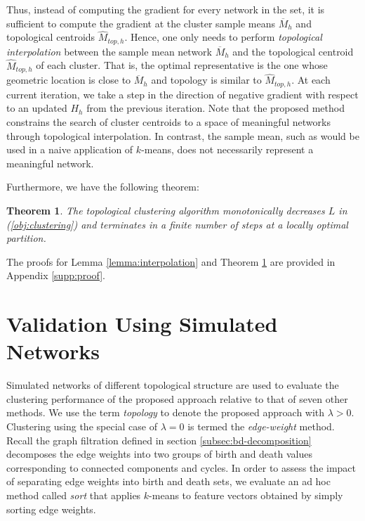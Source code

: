\documentclass{article} %
\newtheorem{theorem}{Theorem}
\begin{document}
Thus, instead of computing the gradient for every network in the set, it is sufficient to compute the gradient at the cluster sample means $\overline M_{h}$ and topological centroids $\widehat M_{top,h}$.
Hence, one only needs to perform {\em topological interpolation} between the sample mean network $\overline M_{h}$ and the topological centroid $\widehat M_{top,h}$ of each cluster. That is, the optimal representative is the one whose geometric location is close to $\overline M_{h}$ and topology is similar to $\widehat M_{top,h}$. 
At each current iteration, we take a step in the direction of negative gradient with respect to an updated $H_h$ from the previous iteration.
Note that the proposed method constrains the search of cluster centroids to a space of meaningful networks through topological interpolation. In contrast, the sample mean, such as would be used in a naive application of $k$-means, does not necessarily represent a meaningful network.

Furthermore, we have the following theorem:

\begin{theorem}
The topological clustering algorithm monotonically decreases $L$ in (\ref{obj:clustering}) and terminates in a finite number of steps at a locally optimal partition.
\label{lemma:localminimum}
\end{theorem}

The proofs for Lemma \ref{lemma:interpolation} and Theorem \ref{lemma:localminimum} are provided in Appendix \ref{supp:proof}.



\section{Validation Using Simulated Networks}
\label{sec:validation}

Simulated networks of different topological structure are used to evaluate the clustering performance of the proposed approach relative to that of seven other methods.
We use the term {\em topology} to denote the proposed approach with $\lambda > 0$.  Clustering using the special case of $\lambda = 0$ is termed the {\em edge-weight} method. Recall the graph filtration defined in section \ref{subsec:bd-decomposition} decomposes the edge weights into two groups of birth and death values corresponding to connected components and cycles. In order to assess the impact of separating edge weights into birth and death sets, we evaluate an ad hoc method called {\em sort} that applies $k$-means to feature vectors obtained by simply sorting edge weights.
\end{document}
